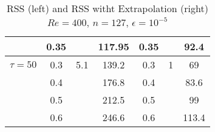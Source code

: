 {\begin{table}[ht!]
\begin{center}
\begin{tabular}{|c||c|c|c||c|c|c|}
\hline 
                       & 0.35 &   & 117.95 & 0.35 &   & 92.4\\ 
\hline 
\hline 
  $\tau = 50$      & 0.3 & 5.1  & 139.2& 0.3 &  1 & 69 \\ 
\hline         
                          & 0.4 &   & 176.8& 0.4 &   & 83.6 \\ 
\hline         
                          & 0.5 &   & 212.5& 0.5 &   & 99 \\     
\hline         
                          & 0.6 &   & 246.6& 0.6 &   & 113.4 \\                         
\hline 
\hline
\end{tabular}
\caption{RSS (left) and RSS witht   Extrapolation (right) $Re=400$, $n=127$, $\epsilon=10^{-5}$}
\label{tab2}
\end{center}
\end{table}

}
